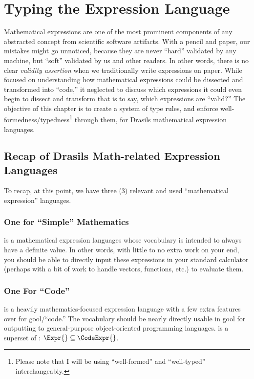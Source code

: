 \chapter{Typing the Expression Language}
\label{chap:typedExpr}

Mathematical expressions are one of the most prominent components of any
abstracted concept from scientific software artifacts. With a pencil and paper,
our mistakes might go unnoticed, because they are never ``hard'' validated by
any machine, but ``soft'' validated by us and other readers. In other words,
there is no clear \textit{validity assertion} when we traditionally write
expressions on paper. While  focused on understanding how
mathematical expressions could be dissected and transformed into ``code,'' it
neglected to discuss which expressions it could even begin to dissect and
transform \textemdash{} that is to say, which expressions are ``valid?'' The
objective of this chapter is to create a system of type rules, and enforce
well-formedness/typedness\footnote{Please note that I will be using
      ``well-formed'' and ``well-typed'' interchangeably.} through them, for Drasils
mathematical expression languages.

\section{Recap of Drasils Math-related Expression Languages}

To recap, at this point, we have three (3) relevant and used ``mathematical
expression'' languages.

\subsection{One for \textquotedblleft{}Simple\textquotedblright{} Mathematics}

\Expr{} is a mathematical expression languages whose vocabulary is intended to
always have a definite value. In other words, with little to no extra work on
your end, you should be able to directly input these expressions in your
standard calculator (perhaps with a bit of work to handle vectors, functions,
etc.) to evaluate them.

\subsection{One For \textquotedblleft{}Code\textquotedblright{}}

\CodeExpr{} is a heavily mathematics-focused expression language with a few
extra features over \Expr{} for \acs{gool}/``code.'' The vocabulary should be
nearly directly usable in \acs{gool} for outputting to general-purpose
object-oriented programming languages. \CodeExpr{} is a superset of \Expr{}:
\(\Expr{} \subseteq{} \CodeExpr{}\).

